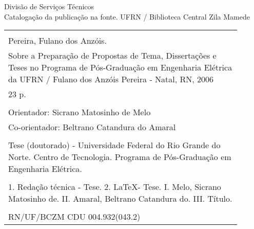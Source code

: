 %
%

\newpage

\begin{center}

\vspace*{\fill}

Divisão de Serviços Técnicos\\[1ex]
Catalogação da publicação na fonte.
UFRN / Biblioteca Central Zila Mamede

\vspace{2ex}

\begin{tabular}{|p{0.9\linewidth}|} \hline
\\
Pereira, Fulano dos Anzóis.\\
\hspace{1em} Sobre a Preparação de Propostas de Tema, Dissertações
e Teses no Programa de Pós-Graduação em Engenharia Elétrica da UFRN /
Fulano dos Anzóis Pereira - Natal, RN, 2006 \\
\hspace{1em} 23 p. \\
\\
\hspace{1em} Orientador: Sicrano Matosinho de Melo \\
\hspace{1em} Co-orientador: Beltrano Catandura do Amaral \\
\\
\hspace{1em} Tese (doutorado) - Universidade Federal do Rio Grande do Norte.
Centro de Tecnologia. Programa de Pós-Graduação em Engenharia Elétrica. \\
\\
\hspace{1em} 1. Redação técnica - Tese. 2. \LaTeX - Tese.
I. Melo, Sicrano Matosinho de. II. Amaral, Beltrano Catandura do.
III. Título. \\
\\
RN/UF/BCZM \hfill CDU 004.932(043.2) \\ \hline
\end{tabular} 

\end{center}
